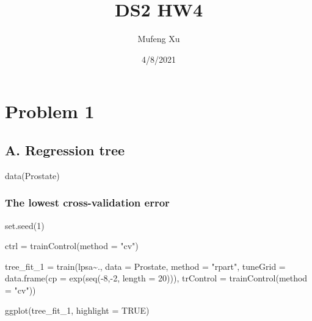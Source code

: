 \documentclass[
]{article}
\title{DS2 HW4}
\author{Mufeng Xu}
\date{4/8/2021}
\newenvironment{Shaded}{\begin{snugshade}}{\end{snugshade}}
\newcommand{\AttributeTok}[1]{\textcolor[rgb]{0.77,0.63,0.00}{#1}}
\newcommand{\ConstantTok}[1]{\textcolor[rgb]{0.00,0.00,0.00}{#1}}
\newcommand{\DecValTok}[1]{\textcolor[rgb]{0.00,0.00,0.81}{#1}}
\newcommand{\FunctionTok}[1]{\textcolor[rgb]{0.00,0.00,0.00}{#1}}
\newcommand{\NormalTok}[1]{#1}
\newcommand{\OtherTok}[1]{\textcolor[rgb]{0.56,0.35,0.01}{#1}}
\newcommand{\SpecialCharTok}[1]{\textcolor[rgb]{0.00,0.00,0.00}{#1}}
\newcommand{\StringTok}[1]{\textcolor[rgb]{0.31,0.60,0.02}{#1}}
\begin{document}
\maketitle

\hypertarget{problem-1}{%
\section{Problem 1}\label{problem-1}}

\hypertarget{a.-regression-tree}{%
\subsection{A. Regression tree}\label{a.-regression-tree}}

\begin{Shaded}
\begin{Highlighting}[]
\FunctionTok{data}\NormalTok{(Prostate)}
\end{Highlighting}
\end{Shaded}

\hypertarget{the-lowest-cross-validation-error}{%
\subsubsection{The lowest cross-validation
error}\label{the-lowest-cross-validation-error}}

\begin{Shaded}
\begin{Highlighting}[]
\FunctionTok{set.seed}\NormalTok{(}\DecValTok{1}\NormalTok{)}

\NormalTok{ctrl }\OtherTok{=} \FunctionTok{trainControl}\NormalTok{(}\AttributeTok{method =} \StringTok{"cv"}\NormalTok{)}

\NormalTok{tree\_fit\_1 }\OtherTok{=} \FunctionTok{train}\NormalTok{(lpsa}\SpecialCharTok{\textasciitilde{}}\NormalTok{.,}
                   \AttributeTok{data =}\NormalTok{ Prostate,}
                   \AttributeTok{method =} \StringTok{"rpart"}\NormalTok{,}
                   \AttributeTok{tuneGrid =} \FunctionTok{data.frame}\NormalTok{(}\AttributeTok{cp =} \FunctionTok{exp}\NormalTok{(}\FunctionTok{seq}\NormalTok{(}\SpecialCharTok{{-}}\DecValTok{8}\NormalTok{,}\SpecialCharTok{{-}}\DecValTok{2}\NormalTok{, }\AttributeTok{length =} \DecValTok{20}\NormalTok{))),}
                   \AttributeTok{trControl =} \FunctionTok{trainControl}\NormalTok{(}\AttributeTok{method =} \StringTok{"cv"}\NormalTok{))}

\FunctionTok{ggplot}\NormalTok{(tree\_fit\_1, }\AttributeTok{highlight =} \ConstantTok{TRUE}\NormalTok{)}
\end{Highlighting}
\end{Shaded}
\end{document}
